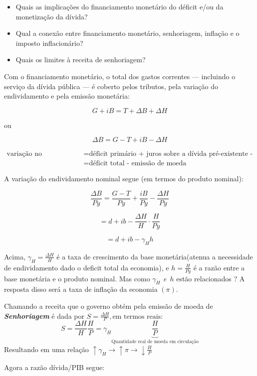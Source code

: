 \documentclass[a4paper,12pt]{article}[abntex2]
\begin{document}
\begin{itemize}
    \item Quais as implicações do financiamento monetário do déficit e/ou da monetização da dívida?
    \item Qual a conexão entre financiamento monetário, senhoriagem, inflação e o imposto inflacionário?
    \item Quais os limites à receita de senhoriagem?
\end{itemize}

Com o financiamento monetário, o total dos gastos correntes — incluindo o serviço da dívida pública — é coberto pelos tributos, pela variação do endividamento e pela emissão monetária:

\[
G + iB = T + \Delta B + \Delta H
\]

ou

\[
\Delta B = G - T + iB - \Delta H
\]

\begin{align*}
\text{variação no endividamento} &= \text{déficit primário + juros sobre a dívida pré-existente - emissão de moeda} \\
                                 &= \text{déficit total - emissão de moeda}
\end{align*}

A variação do endividamento nominal segue (em termos do produto nominal):

\[
\frac{\Delta B}{Py} = \frac{G - T}{Py} + \frac{iB}{Py} - \frac{\Delta H}{Py}
\]

\[
= d + ib - \frac{\Delta H}{H} \cdot \frac{H}{Py}
\]

\[
= d + ib - \gamma_H h
\]

Acima, \(\gamma_H = \frac{\Delta H}{H}\) é a taxa de crescimento da base monetária(atenua a necessidade de endividamento dado o deficit total da economia), e \(h = \frac{H}{Py}\) é a razão entre a base monetária e o produto nominal.
Mas como \(\gamma_H \ \ e \ \ h\) estão relacionados ? A resposta disso será a taxa de inflação da economia \((\pi)\). 

Chamando a receita que o governo obtém pela emissão de moeda de \textbf{\textit{Senhoriagem}} é dada por \(S=\frac{\Delta H}{P}, \text{em termos reais}\):
\[
S=\frac{\Delta H}{H}\frac{H}{P}=\gamma_H\underbrace{\frac{H}{P}}_{\text{Quantidade real de moeda em circulação}}
\]
Resultando em uma relação \(\uparrow\gamma_H\rightarrow\uparrow\pi\rightarrow\downarrow\frac{H}{P}\)

Agora a razão dívida/PIB segue:
\end{document}
